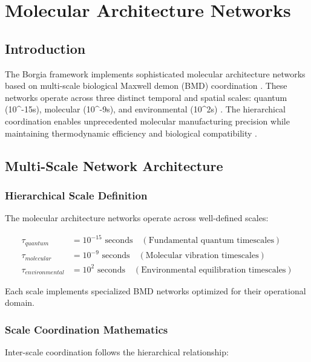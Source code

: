\section{Molecular Architecture Networks}

\subsection{Introduction}

The Borgia framework implements sophisticated molecular architecture networks based on multi-scale biological Maxwell demon (BMD) coordination \cite{mizraji2007biological,sachikonye2024oscillatory}. These networks operate across three distinct temporal and spatial scales: quantum (10^{-15}s), molecular (10^{-9}s), and environmental (10^2s) \cite{ball2011physics,tegmark2000importance}. The hierarchical coordination enables unprecedented molecular manufacturing precision while maintaining thermodynamic efficiency and biological compatibility \cite{vedral2011living}.

\subsection{Multi-Scale Network Architecture}

\subsubsection{Hierarchical Scale Definition}

The molecular architecture networks operate across well-defined scales:

\begin{align}
\tau_{quantum} &= 10^{-15} \text{ seconds} \quad (\text{Fundamental quantum timescales}) \\
\tau_{molecular} &= 10^{-9} \text{ seconds} \quad (\text{Molecular vibration timescales}) \\
\tau_{environmental} &= 10^{2} \text{ seconds} \quad (\text{Environmental equilibration timescales})
\end{align}

Each scale implements specialized BMD networks optimized for their operational domain.

\subsubsection{Scale Coordination Mathematics}

Inter-scale coordination follows the hierarchical relationship:

